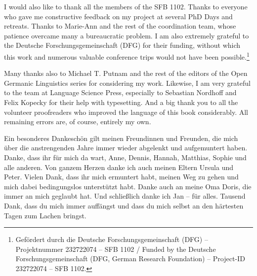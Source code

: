 I would also like to thank all the members of the SFB 1102. Thanks to everyone who gave me constructive feedback on my project at several PhD Days and retreats. Thanks to Marie-Ann and the rest of the coordination team, whose patience overcame many a bureaucratic problem. I am also extremely grateful to the Deutsche Forschungsgemeinschaft (DFG) for their funding, without which this work and numerous valuable conference trips would not have been possible.\footnote{Gefördert durch die Deutsche Forschungsgemeinschaft (DFG) – Projektnummer 232722074 – SFB 1102 / Funded by the Deutsche Forschungsgemeinschaft (DFG, German Research Foundation) – Project-ID 232722074 – SFB 1102.}

Many thanks also to Michael T. Putnam and the rest of the editors of the Open Germanic Linguistics series for considering my work. Likewise, I am very grateful to the team at Language Science Press, especially to Sebastian Nordhoff and Felix Kopecky for their help with typesetting. And a big thank you to all the volunteer proofreaders who improved the language of this book considerably. All remaining errors are, of course, entirely my own.

Ein besonderes Dankeschön gilt meinen Freundinnen und Freunden, die mich über die anstrengenden Jahre immer wieder abgelenkt und aufgemuntert haben. Danke, dass ihr für mich da wart, Anne, Dennis, Hannah, Matthias, Sophie und alle anderen. Von ganzem Herzen danke ich auch meinen Eltern Ursula und Peter. Vielen Dank, dass ihr mich ermuntert habt, meinen Weg zu gehen und mich dabei bedingungslos unterstützt habt. Danke auch an meine Oma Doris, die immer an mich geglaubt hat. Und schließlich danke ich Jan -- für alles. Tausend Dank, dass du mich immer auffängst und dass du mich selbst an den härtesten Tagen zum Lachen bringst.
